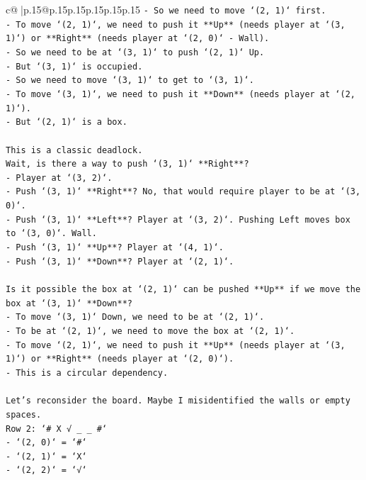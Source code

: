 \documentclass{article}
\begin{document}
{\begin{supertabular}{c@{$\;$}|p{.15\linewidth}@{}p{.15\linewidth}p{.15\linewidth}p{.15\linewidth}p{.15\linewidth}p{.15\linewidth}}
{{{\texttt{{-} So we need to move `(2, 1)` first.} \\
\texttt{{-} To move `(2, 1)`, we need to push it **Up** (needs player at `(3, 1)`) or **Right** (needs player at `(2, 0)` {-} Wall).} \\
\texttt{{-} So we need to be at `(3, 1)` to push `(2, 1)` Up.} \\
\texttt{{-} But `(3, 1)` is occupied.} \\
\texttt{{-} So we need to move `(3, 1)` to get to `(3, 1)`.} \\
\texttt{{-} To move `(3, 1)`, we need to push it **Down** (needs player at `(2, 1)`).} \\
\texttt{{-} But `(2, 1)` is a box.} \\
\\ 
\texttt{This is a classic deadlock.} \\
\texttt{Wait, is there a way to push `(3, 1)` **Right**?} \\
\texttt{{-} Player at `(3, 2)`.} \\
\texttt{{-} Push `(3, 1)` **Right**? No, that would require player to be at `(3, 0)`.} \\
\texttt{{-} Push `(3, 1)` **Left**? Player at `(3, 2)`. Pushing Left moves box to `(3, 0)`. Wall.} \\
\texttt{{-} Push `(3, 1)` **Up**? Player at `(4, 1)`.} \\
\texttt{{-} Push `(3, 1)` **Down**? Player at `(2, 1)`.} \\
\\ 
\texttt{Is it possible the box at `(2, 1)` can be pushed **Up** if we move the box at `(3, 1)` **Down**?} \\
\texttt{{-} To move `(3, 1)` Down, we need to be at `(2, 1)`.} \\
\texttt{{-} To be at `(2, 1)`, we need to move the box at `(2, 1)`.} \\
\texttt{{-} To move `(2, 1)`, we need to push it **Up** (needs player at `(3, 1)`) or **Right** (needs player at `(2, 0)`).} \\
\texttt{{-} This is a circular dependency.} \\
\\ 
\texttt{Let's reconsider the board. Maybe I misidentified the walls or empty spaces.} \\
\texttt{Row 2: `\# X √ \_ \_ \#`} \\
\texttt{{-} `(2, 0)` = `\#`} \\
\texttt{{-} `(2, 1)` = `X`} \\
\texttt{{-} `(2, 2)` = `√`} \\
}}}
\end{supertabular}}
\end{document}
